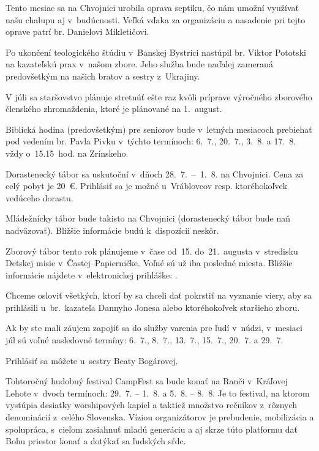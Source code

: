 Tento mesiac sa na Chvojnici urobila oprava septiku, čo nám umožní využívať našu chalupu aj v~budúcnosti. Veľká vďaka za organizáciu a nasadenie pri tejto oprave patrí br. Danielovi Mikletičovi.

Po ukončení teologického štúdiu v~Banskej Bystrici nastúpil br. Viktor Pototski na kazateľskú prax v~našom zbore. Jeho služba bude naďalej zameraná predovšetkým na našich bratov a sestry z~Ukrajiny.

V júli sa staršovstvo plánuje stretnúť ešte raz kvôli príprave výročného zborového členského zhromaždenia, ktoré je plánované na 1.~august.



Biblická hodina (predovšetkým) pre seniorov bude v~letných mesiacoch prebiehať pod vedením br. Pavla Pivku v~týchto termínoch: 6.~7., 20.~7., 3.~8. a 17.~8. vždy o~15.15~hod. na Zrínskeho.


Dorastenecký tábor sa uskutoční v~dňoch 28.~7.~--~1.~8. na Chvojnici. Cena za celý pobyt je 20~€. Prihlásiť sa je možné u~Vráblovcov resp. ktoréhokoľvek vedúceho dorastu.

Mládežnícky tábor bude takisto na Chvojnici (dorastenecký tábor bude naň nadväzovať). Bližšie informácie budú k~dispozícii neskôr.


Zborový tábor tento rok plánujeme v~čase od~15. do~21.~augusta v~stredisku Detskej misie v~Častej–Papierničke. Voľné sú už iba posledné miesta. Bližšie informácie nájdete v~elektronickej prihláške: .


Chceme osloviť všetkých, ktorí by sa chceli dať pokrstiť na vyznanie viery, aby sa prihlásili u~br.~kazateľa Dannyho Jonesa alebo ktoréhokoľvek staršieho zboru.


Ak by ste mali záujem zapojiť sa do služby varenia pre ľudí v~núdzi, v~mesiaci júl sú voľné nasledovné termíny: 6.~7., 8.~7., 13.~7., 15.~7., 20.~7. a 29.~7.

Prihlásiť sa môžete u~sestry Beaty Bogárovej.


Tohtoročný hudobný festival CampFest sa bude konať na Ranči v~Kráľovej Lehote v~dvoch termínoch: 29.~7. -- 1.~8. a 5.~8. -- 8.~8. Je to festival, na ktorom vystúpia desiatky worshipových kapiel a taktiež množstvo rečníkov z~rôznych denominácií z~celého Slovenska. Víziou organizátorov je prebudenie, mobilizácia a spolupráca, s~cieľom zasiahnuť mladú generáciu a aj skrze túto platformu dať Bohu priestor konať a dotýkať sa ľudských sŕdc.


